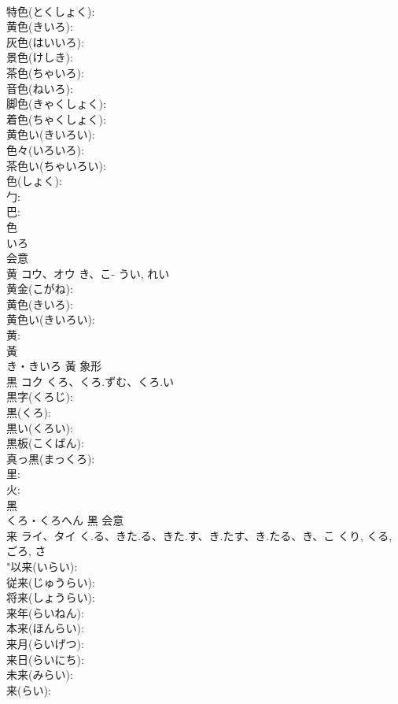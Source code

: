 \documentclass[8pt]{extreport}
\begin{document}
\begin{CJK}{UTF8}{min}
\\	特色(とくしょく): 
\\	黄色(きいろ): 
\\	灰色(はいいろ): 
\\	景色(けしき): 
\\	茶色(ちゃいろ): 
\\	音色(ねいろ): 
\\	脚色(きゃくしょく): 
\\	着色(ちゃくしょく): 
\\	黄色い(きいろい): 
\\	色々(いろいろ): 
\\	茶色い(ちゃいろい): 
\\	色(しょく): 
\\	勹: 
\\	巴: 
\\	色	
\\	いろ	
\\	会意 
\\	黄	コウ、オウ	き、こ-	うい, れい	
\\	黄金(こがね): 
\\	黄色(きいろ): 
\\	黄色い(きいろい): 
\\	黄: 
\\	黃	
\\	き・きいろ	黃	象形 
\\	黒	コク	くろ、くろ.ずむ、くろ.い		
\\	黒字(くろじ): 
\\	黒(くろ): 
\\	黒い(くろい): 
\\	黒板(こくばん): 
\\	真っ黒(まっくろ): 
\\	里: 
\\	火: 
\\	黑	
\\	くろ・くろへん	黑	会意 
\\	来	ライ、タイ	く.る、きた.る、きた.す、き.たす、き.たる、き、こ	くり, くる, ごろ, さ	
\\	"以来(いらい): 
\\	従来(じゅうらい): 
\\	将来(しょうらい): 
\\	来年(らいねん): 
\\	本来(ほんらい): 
\\	来月(らいげつ): 
\\	来日(らいにち): 
\\	未来(みらい): 
\\	来(らい): 

\end{CJK}
\end{document}
